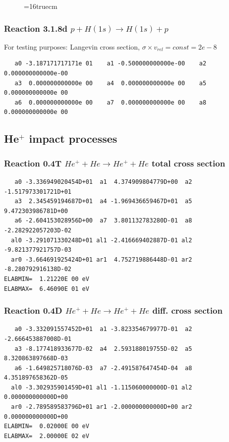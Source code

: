 \documentclass[12pt,dvips]{article}
\begin{document}
\begin{figure} \label{318RS}
\epsfxsize=16truecm
\end{figure}
\newpage
\subsubsection{
Reaction 3.1.8d $  p + H(1s) \rightarrow H(1s) + p  $
}
For testing purposes:
Langevin cross section, $\sigma \times v_{rel} = const = 2e-8$

\begin{small}\begin{verbatim}
   a0 -3.187171717171e 01    a1 -0.500000000000e-00    a2  0.000000000000e-00
   a3  0.000000000000e 00    a4  0.000000000000e 00    a5  0.000000000000e 00
   a6  0.000000000000e 00    a7  0.000000000000e 00    a8  0.000000000000e 00
\end{verbatim}\end{small}

\newpage
\subsection{He$^+$ impact processes}
\subsubsection{
Reaction 0.4T   $  He^+ + He \rightarrow He^+ + He $  total cross section
}



\begin{small}\begin{verbatim}
   a0 -3.336949020454D+01  a1  4.374909804779D+00  a2 -1.517973301721D+01
   a3  2.345459194687D+01  a4 -1.969436659467D+01  a5  9.472303986781D+00
   a6 -2.604153028956D+00  a7  3.801132783280D-01  a8 -2.282922057203D-02
  al0 -3.291071330248D+01 al1 -2.416669402887D-01 al2 -9.821377921757D-03
  ar0 -3.664691925424D+01 ar1  4.752719886448D-01 ar2 -8.280792916138D-02
ELABMIN=  1.21220E 00 eV
ELABMAX=  6.46090E 01 eV
\end{verbatim}\end{small}

\subsubsection{
Reaction 0.4D    $He^+ + He \rightarrow He^+ + He$   diff. cross section
}


\begin{small}\begin{verbatim}
   a0 -3.332091557452D+01  a1 -3.823354679977D-01  a2 -2.666453887008D-01
   a3 -8.177418933677D-02  a4  2.593188019755D-02  a5  8.320863897668D-03
   a6 -1.649825718076D-03  a7 -2.491587647454D-04  a8  4.351897658362D-05
  al0 -3.302935901459D+01 al1 -1.115060000000D-01 al2  0.000000000000D+00
  ar0 -2.789589583796D+01 ar1 -2.000000000000D+00 ar2  0.000000000000D+00
ELABMIN=  0.02000E 00 eV
ELABMAX=  2.00000E 02 eV
\end{verbatim}\end{small}
\end{document}
